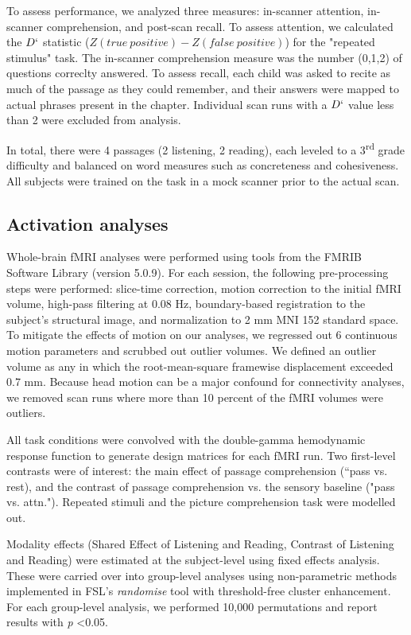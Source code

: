 To assess performance, we analyzed three measures: in-scanner attention, in-scanner comprehension, and post-scan recall. To assess attention, we calculated the $D`$ statistic ($Z(true\ positive) - Z(false\ positive)$) for the "repeated stimulus" task. The in-scanner comprehension measure was the number (0,1,2) of questions correclty answered. To assess recall, each child was asked to recite as much of the passage as they could remember, and their answers were mapped to actual phrases present in the chapter. Individual scan runs with a $D`$ value less than 2 were excluded from analysis.

In total, there were 4 passages (2 listening, 2 reading), each leveled to a 3\textsuperscript{rd} grade difficulty and balanced on word measures such as concreteness and cohesiveness.  All subjects were trained on the task in a mock scanner prior to the actual scan. 


\subsection{Activation analyses}

Whole-brain fMRI analyses were performed using tools from the FMRIB Software Library (version 5.0.9). For each session, the following pre-processing steps were performed:  slice-time correction, motion correction to the initial fMRI volume, high-pass filtering at 0.08 Hz, boundary-based registration to the subject's structural image, and normalization to 2 mm MNI 152 standard space. To mitigate the effects of motion on our analyses, we regressed out 6 continuous motion parameters and scrubbed out outlier volumes. We defined an outlier volume as any in which the root-mean-square framewise displacement exceeded 0.7 mm. Because head motion can be a major confound for connectivity analyses, we removed scan runs where more than 10 percent of the fMRI volumes were outliers.

All task conditions were convolved with the double-gamma hemodynamic response function to generate design matrices for each fMRI run. Two first-level contrasts were of interest: the main effect of passage comprehension (“pass vs. rest), and the contrast of passage comprehension vs. the sensory baseline ("pass vs. attn."). Repeated stimuli and the picture comprehension task were modelled out.

Modality effects (Shared Effect of Listening and Reading, Contrast of Listening and Reading) were estimated at the subject-level using fixed effects analysis. These were carried over into group-level analyses using non-parametric methods implemented in FSL’s \textit{randomise} tool with threshold-free cluster enhancement. For each group-level analysis, we performed 10,000 permutations and report results with \textit{p} \textless 0.05. 

